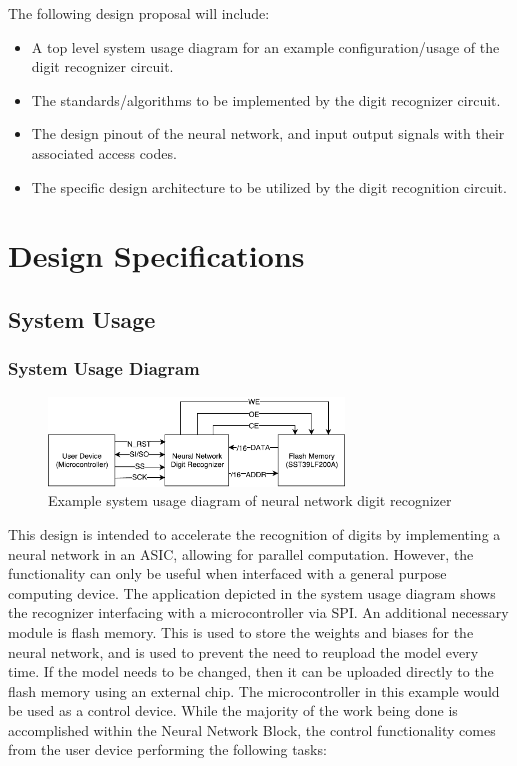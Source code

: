 \documentclass[12pt]{article}
\begin{document}
The following design proposal will include:

\begin{itemize}
    \item A top level system usage diagram for an example configuration/usage of the digit recognizer circuit.
    \item The standards/algorithms to be implemented by the digit recognizer circuit.
    \item The design pinout of the neural network, and input output signals with their associated access codes.
    \item The specific design architecture to be utilized by the digit recognition circuit.
\end{itemize}

\section{Design Specifications}
\subsection{System Usage}
\subsubsection{System Usage Diagram\label{sec:sysuse}}
\begin{figure}[H]
    \centering
    \includegraphics[width=0.7\textwidth]{top_level_block.pdf}
    \caption{Example system usage diagram of neural network digit recognizer}
    \label{fig:top}
\end{figure}

This design is intended to accelerate the recognition of digits by implementing a neural network in an ASIC, allowing for parallel computation. However, the functionality can only be useful when interfaced with a general purpose computing device. The application depicted in the system usage diagram shows the recognizer interfacing with a microcontroller via SPI. An additional necessary module is flash memory. This is used to store the weights and biases for the neural network, and is used to prevent the need to reupload the model every time. If the model needs to be changed, then it can be uploaded directly to the flash memory using an external chip. The microcontroller in this example would be used as a control device. While the majority of the work being done is accomplished within the Neural Network Block, the control functionality comes from the user device performing the following tasks:
\end{document}
